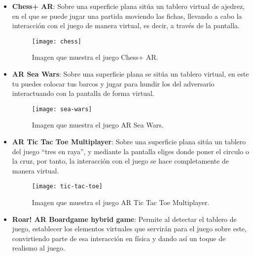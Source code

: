 \begin{itemize}
  \item \textbf{Chess+ AR}: Sobre una superficie plana sitúa un tablero virtual de ajedrez, en el que se puede jugar una partida moviendo las fichas, llevando a cabo la interacción con el juego de manera virtual, es decir, a través de la pantalla.

  \begin{figure}[h]
    \centering
    \texttt{[image: chess]}
    \caption{Imagen que muestra el juego Chess+ AR.\protect\footnotemark}
    \label{figura-siege-breakers}
  \end{figure}


  \newpage

  \item \textbf{AR Sea Wars}: Sobre una superficie plana se sitúa un tablero virtual, en este tu puedes colocar tus barcos y jugar para hundir los del adversario interactuando con la pantalla de forma virtual.

  \begin{figure}[h]
    \centering
    \texttt{[image: sea-wars]}
    \caption{Imagen que muestra el juego AR Sea Wars.\protect\footnotemark}
    \label{figura-sea-wars}
  \end{figure}


  \item \textbf{AR Tic Tac Toe Multiplayer}: Sobre una superficie plana sitúa un tablero del juego “tres en raya”, y mediante la pantalla eliges donde poner el circulo o la cruz, por tanto, la interacción con el juego se hace completamente de manera virtual.

  \begin{figure}[h]
    \centering
    \texttt{[image: tic-tac-toe]}
    \caption{Imagen que muestra el juego AR Tic Tac Toe Multiplayer.\protect\footnotemark}
    \label{figura-tic-tac-toe}
  \end{figure}


  \newpage

  \item \textbf{Roar! AR Boardgame hybrid game}: Permite al detectar el tablero de juego, establecer los elementos virtuales que servirán para el juego sobre este, convirtiendo parte de esa interacción en física y dando así un toque de realismo al juego.


\end{itemize}
